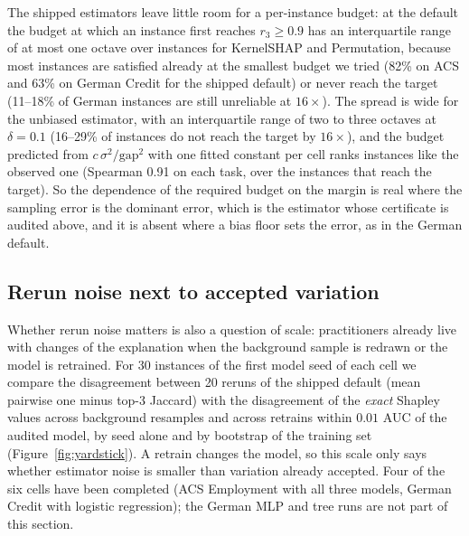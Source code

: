 The shipped estimators leave little room for a per-instance budget: at the default the budget at which an instance first reaches $r_3\ge0.9$ has an interquartile range of at most one octave over instances for KernelSHAP and Permutation, because most instances are satisfied already at the smallest budget we tried (82\% on ACS and 63\% on German Credit for the shipped default) or never reach the target (11--18\% of German instances are still unreliable at $16\times$). The spread is wide for the unbiased estimator, with an interquartile range of two to three octaves at $\delta=0.1$ (16--29\% of instances do not reach the target by $16\times$), and the budget predicted from $c\,\sigma^2/\mathrm{gap}^2$ with one fitted constant per cell ranks instances like the observed one (Spearman 0.91 on each task, over the instances that reach the target). So the dependence of the required budget on the margin is real where the sampling error is the dominant error, which is the estimator whose certificate is audited above, and it is absent where a bias floor sets the error, as in the German default.

\subsection{Rerun noise next to accepted variation}
\label{sec:exp-yardstick}

Whether rerun noise matters is also a question of scale: practitioners already live with changes of the explanation when the background sample is redrawn or the model is retrained. For 30 instances of the first model seed of each cell we compare the disagreement between 20 reruns of the shipped default (mean pairwise one minus top-3 Jaccard) with the disagreement of the \emph{exact} Shapley values across background resamples and across retrains within $0.01$ AUC of the audited model, by seed alone and by bootstrap of the training set (Figure~\ref{fig:yardstick}). A retrain changes the model, so this scale only says whether estimator noise is smaller than variation already accepted. Four of the six cells have been completed (ACS Employment with all three models, German Credit with logistic regression); the German MLP and tree runs are not part of this section.

